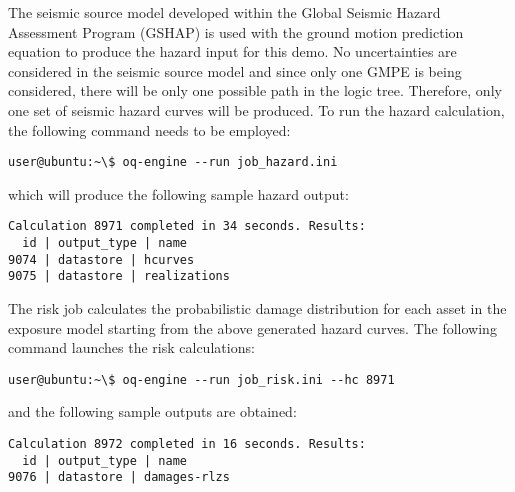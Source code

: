 The seismic source model developed within the Global Seismic Hazard Assessment
Program (GSHAP) is used with the \cite{chiou2008} ground motion prediction
equation to produce the hazard input for this demo. No uncertainties are
considered in the seismic source model and since only one GMPE is being
considered, there will be only one possible path in the logic tree. Therefore,
only one set of seismic hazard curves will be produced. To run the hazard
calculation, the following command needs to be employed:

\begin{verbatim}
user@ubuntu:~\$ oq-engine --run job_hazard.ini
\end{verbatim}

which will produce the following sample hazard output:

\begin{verbatim}
Calculation 8971 completed in 34 seconds. Results:
  id | output_type | name
9074 | datastore | hcurves
9075 | datastore | realizations
\end{verbatim}

The risk job calculates the probabilistic damage distribution for each asset
in the exposure model starting from the above generated hazard curves. The
following command launches the risk calculations:

\begin{verbatim}
user@ubuntu:~\$ oq-engine --run job_risk.ini --hc 8971
\end{verbatim}

and the following sample outputs are obtained:

\begin{verbatim}
Calculation 8972 completed in 16 seconds. Results:
  id | output_type | name
9076 | datastore | damages-rlzs
\end{verbatim}
